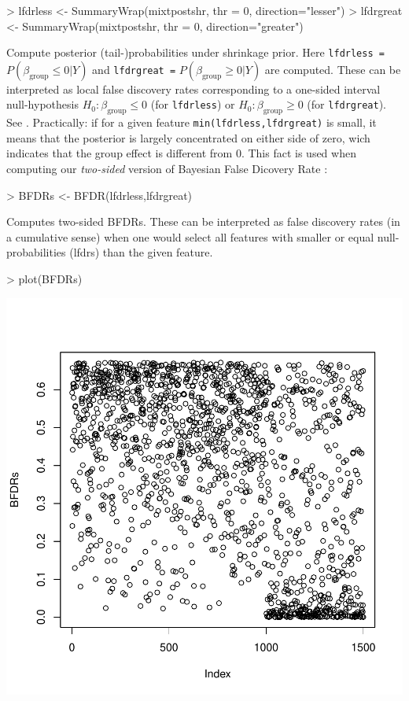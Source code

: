 \documentclass[11pt]{article}
\begin{document}
\begin{Schunk}
\begin{Sinput}
> lfdrless <- SummaryWrap(mixtpostshr, thr = 0, direction="lesser")
> lfdrgreat <- SummaryWrap(mixtpostshr, thr = 0, direction="greater")
\end{Sinput}
\end{Schunk}
Compute posterior (tail-)probabilities under shrinkage prior.
Here {\tt lfdrless =} $P(\beta_{\text{group}} \leq  0 | Y)$ and {\tt lfdrgreat =} $P(\beta_{\text{group}} \geq  0 |Y)$ are computed.
These can be interpreted as local false discovery rates corresponding to a one-sided interval null-hypothesis
$H_0: \beta_{\text{group}} \leq  0$ (for {\tt lfdrless}) or $H_0: \beta_{\text{group}} \geq  0$ (for {\tt lfdrgreat}). See
\citep{WielShrinkSeq}. Practically: if for a given feature {\tt min(lfdrless,lfdrgreat)} is small, it means that the posterior
is largely concentrated on either side of zero, wich indicates that the group effect is different from 0. This fact is used
when computing our {\it two-sided} version of Bayesian False Dicovery Rate \citep[BFDR]{Ventrucci, WielShrinkSeq}:


\begin{Schunk}
\begin{Sinput}
> BFDRs <- BFDR(lfdrless,lfdrgreat)
\end{Sinput}
\end{Schunk}
Computes two-sided BFDRs. These can be interpreted as false discovery rates (in a cumulative sense) when one would select all
features with smaller or equal null-probabilities (lfdrs) than the given feature.

\begin{Schunk}
\begin{Sinput}
> plot(BFDRs)
\end{Sinput}
\end{Schunk}
\includegraphics{ShrinkBayes-023}
\end{document}
